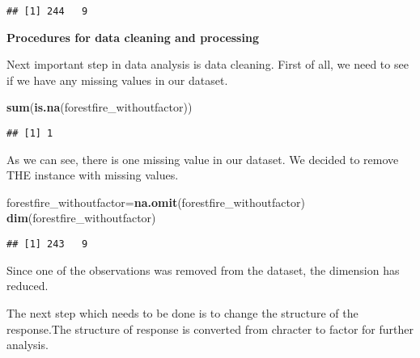 \documentclass[
]{article}
\newenvironment{Shaded}{\begin{snugshade}}{\end{snugshade}}
\newcommand{\KeywordTok}[1]{\textcolor[rgb]{0.13,0.29,0.53}{\textbf{#1}}}
\newcommand{\NormalTok}[1]{#1}
\newcommand{\OperatorTok}[1]{\textcolor[rgb]{0.81,0.36,0.00}{\textbf{#1}}}
\begin{document}
\begin{verbatim}
## [1] 244   9
\end{verbatim}

\textbf{Procedures for data cleaning and processing}

Next important step in data analysis is data cleaning. First of all, we
need to see if we have any missing values in our dataset.

\begin{Shaded}
\begin{Highlighting}[]
\KeywordTok{sum}\NormalTok{(}\KeywordTok{is.na}\NormalTok{(forestfire_withoutfactor))}
\end{Highlighting}
\end{Shaded}

\begin{verbatim}
## [1] 1
\end{verbatim}

As we can see, there is one missing value in our dataset. We decided to
remove THE instance with missing values.

\begin{Shaded}
\begin{Highlighting}[]
\NormalTok{forestfire_withoutfactor=}\KeywordTok{na.omit}\NormalTok{(forestfire_withoutfactor)}
\KeywordTok{dim}\NormalTok{(forestfire_withoutfactor)}
\end{Highlighting}
\end{Shaded}

\begin{verbatim}
## [1] 243   9
\end{verbatim}

Since one of the observations was removed from the dataset, the
dimension has reduced.

The next step which needs to be done is to change the structure of the
response.The structure of response is converted from chracter to factor
for further analysis.

\begin{Shaded}
\end{Shaded}
\end{document}
